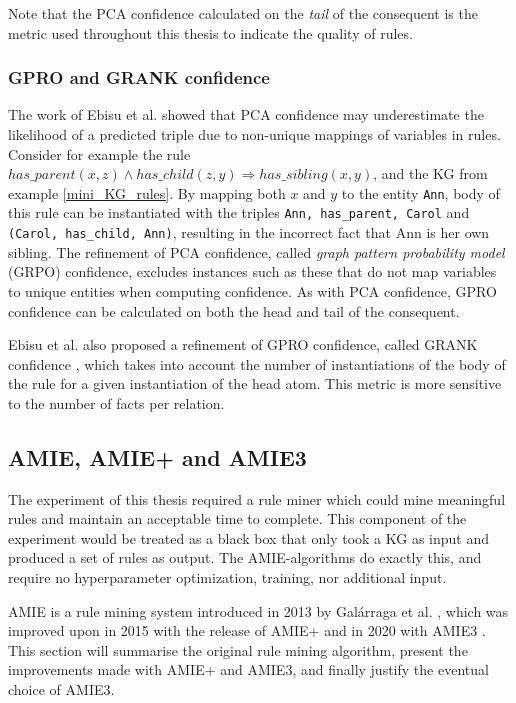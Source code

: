 Note that the PCA confidence calculated on the \textit{tail} of the consequent is the metric used throughout this thesis to indicate the quality of rules.

\subsubsection{GPRO and GRANK confidence}
The work of Ebisu et al. \cite{gpro} showed that PCA confidence may underestimate the likelihood of a predicted triple due to non-unique mappings of variables in rules. Consider for example the rule $has\_parent(x, z) \wedge has\_child(z, y) \Rightarrow has\_sibling(x, y)$, and the KG from example \ref{mini_KG_rules}. By mapping both $x$ and $y$ to the entity \texttt{Ann}, body of this rule can be instantiated with the triples \texttt{Ann, has\_parent, Carol} and \texttt{(Carol, has\_child, Ann)}, resulting in the incorrect fact that Ann is her own sibling. The refinement of PCA confidence, called \textit{graph pattern probability model} (GRPO) confidence, excludes instances such as these that do not map variables to unique entities when computing confidence. As with PCA confidence, GPRO confidence can be calculated on both the head and tail of the consequent.

Ebisu et al. also proposed a refinement of GPRO confidence, called GRANK confidence \cite{gpro}, which takes into account the number of instantiations of the body of the rule for a given instantiation of the head atom. This metric is more sensitive to the number of facts per relation.


\subsection{AMIE, AMIE+ and AMIE3}
\label{the_amies}
The experiment of this thesis required a rule miner which could mine meaningful rules and maintain an acceptable time to complete. This component of the experiment would be treated as a black box that only took a KG as input and produced a set of rules as output. The AMIE-algorithms do exactly this, and require no hyperparameter optimization, training, nor additional input.

AMIE is a rule mining system introduced in 2013 by Galárraga et al. \cite{amie}, which was improved upon in 2015 with the release of AMIE+ \cite{amie_plus} and in 2020 with AMIE3 \cite{amie3}. This section will summarise the original rule mining algorithm, present the improvements made with AMIE+ and AMIE3, and finally justify the eventual choice of AMIE3.

